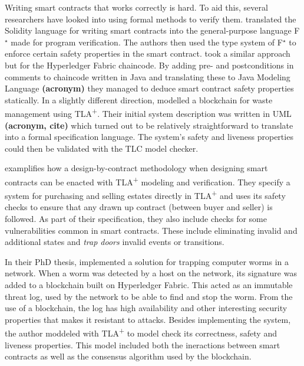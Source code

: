 \documentclass[english, biblatex, digitaloutput]{kththesis}
\begin{document}
Writing smart contracts that works correctly is hard. To aid this, several researchers have looked into using formal methods to verify them. \textcite{bhargavan_formal_2016} translated the Solidity language for writing smart contracts into the general-purpose language F$^{\star}$ made for program verification. The authors then used the type system of F$^{\star}$ to enforce certain safety properties in the smart contract. \textcite{beckert_formal_2018} took a similar approach but for the Hyperledger Fabric chaincode. By adding pre- and postconditions in comments to chaincode written in Java and translating these to Java Modeling Language \textbf{(acronym)} they managed to deduce smart contract safety properties statically. In a slightly different direction, \textcite{latif_blockchain_2019} modelled a blockchain for waste management using TLA\textsuperscript+. Their initial system description was written in UML \textbf{(acronym, cite)} which turned out to be relatively straightforward to translate into a formal specification language. The system's safety and liveness properties could then be validated with the TLC model checker.

\textcite{bracciali_building_2020} examplifies how a design-by-contract methodology \cite{meyer_applying_1992} when designing smart contracts can be enacted with TLA\textsuperscript+ modeling and verification. They specify a system for purchasing and selling estates directly in TLA\textsuperscript+ and uses its safety checks to ensure that any drawn up contract (between buyer and seller) is followed. As part of their specification, they also include checks for some vulnerabilities common in smart contracts. These include eliminating invalid and additional states and \textit{trap doors} \ie invalid events or transitions.

In  their PhD thesis, \textcite{elsayed_blockchain-based_2020} implemented a solution for trapping computer worms in a network. When a worm was detected by a host on the network, its signature was added to a blockchain built on Hyperledger Fabric. This acted as an immutable threat log, used by the network to be able to find and stop the worm. From the use of a blockchain, the log has high availability and other interesting security properties that makes it resistant to attacks. Besides implementing the system, the author moddeled with TLA\textsuperscript+ to model check its correctness, safety and liveness properties. This model included both the ineractions between smart contracts as well as the consensus algorithm used by the blockchain.
\end{document}
